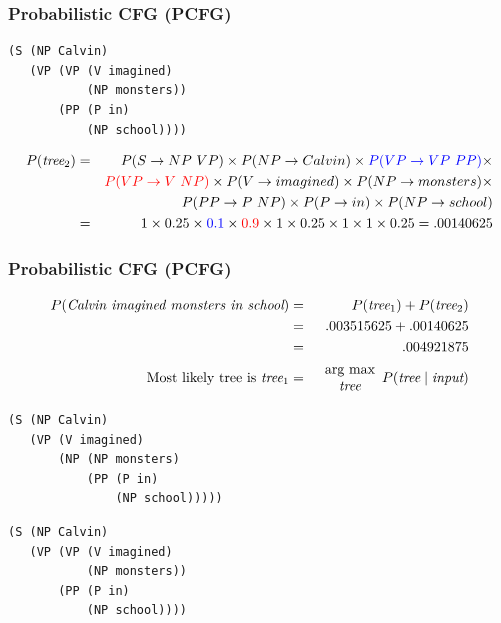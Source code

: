 \begin{frame}[fragile]
\frametitle{Probabilistic CFG (PCFG)}
\begin{verbatim}
(S (NP Calvin)
   (VP (VP (V imagined)
           (NP monsters))
       (PP (P in)
           (NP school))))
\end{verbatim}
{\small
\begin{eqnarray*}
P(\textit{tree$_2$})& = & P(S \rightarrow NP\ VP) \times
      P(NP \rightarrow Calvin) \times
      {\color{blue} P(VP \rightarrow VP\ PP)} \times \nonumber \\
&& {\color{red} P(VP \rightarrow V\ NP)} \times
   P(V \rightarrow imagined) \times 
   P(NP \rightarrow monsters) \times \nonumber \\
&& P(PP \rightarrow P\ NP) \times  
   P(P \rightarrow in) \times  
   P(NP \rightarrow school) \nonumber \\
& = & 1 \times 0.25 \times {\color{blue} 0.1} \times {\color{red} 0.9} \times 1 \times 0.25 \times 1 \times 1 \times 0.25 = .00140625 \nonumber 
\end{eqnarray*}
}
\end{frame}

\begin{frame}[fragile]
\frametitle{Probabilistic CFG (PCFG)}
\begin{eqnarray}
P(\textit{Calvin imagined monsters in school}) & = &
P(\textit{tree$_1$}) + P(\textit{tree$_2$}) \nonumber\\ 
& = & .003515625 + .00140625 \nonumber \\
& = & .004921875 \nonumber\\
\textrm{Most likely tree is \textit{tree$_1$}} & = & \begin{array}{c}\mbox{arg max}\\\textit{tree}\end{array} P(\textit{tree} \mid \textit{input}) \nonumber
\end{eqnarray}
\bigskip
\begin{minipage}{4in}
\begin{verbatim}
(S (NP Calvin)
   (VP (V imagined)
       (NP (NP monsters)
           (PP (P in)
               (NP school)))))
\end{verbatim}
\end{minipage}
\begin{minipage}{4in}
\begin{verbatim}
(S (NP Calvin)
   (VP (VP (V imagined)
           (NP monsters))
       (PP (P in)
           (NP school))))
\end{verbatim}
\end{minipage}

\end{frame}


